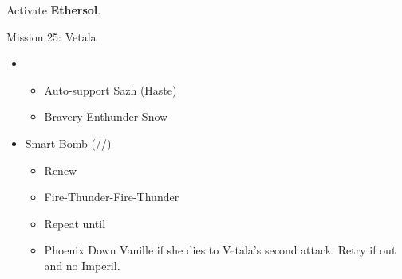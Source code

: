 \begin{paracol}{2}
	Activate \textbf{Ethersol}.
	\renewcommand{\fifth}{[5] Smart Bomb (\rav/\sab/\rav)}
	\switchcolumn
	\switchcolumn*
	\begin{battle}{Mission 25: Vetala}
		\begin{itemize}
			\item \first
			      \begin{itemize}
				      \item Auto-support Sazh (Haste)
				      \item Bravery-Enthunder Snow
			      \end{itemize}
			\item \fifth
			      \begin{itemize}
				      \item Renew
				      \item Fire-Thunder-Fire-Thunder
				      \item Repeat until \stagger
				      \item Phoenix Down Vanille if she dies to Vetala's second attack. Retry if out and no Imperil.
			      \end{itemize}


\end{itemize}
\end{battle}
\end{paracol}
